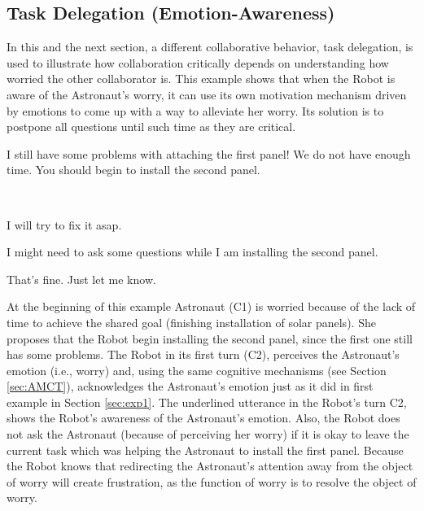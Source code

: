 \subsection{Task Delegation (Emotion-Awareness)}
\label{sec:exp3}

In this and the next section, a different collaborative behavior, task
delegation, is used to illustrate how collaboration critically depends on
understanding how worried the other collaborator is. This example shows that
when the Robot is aware of the Astronaut's worry, it can use its own motivation
mechanism driven by emotions to come up with a way to alleviate her worry. Its
solution is to postpone all questions until such time as they are
critical. 

\begin{description}
  \item \textit{\textbf{\fontsize{9pt}{12pt}\selectfont{C1. Astronaut:}}} I
  still have some problems with attaching the first panel! We do not have enough
  time. You should begin to install the second panel.\\

  \item {}\\

  \item \textit{\textbf{\fontsize{9pt}{12pt}\selectfont{C3. Astronaut:}}} I will
  try to fix it asap.\\

  \item \textit{\textbf{\fontsize{9pt}{12pt}\selectfont{C4. Robot:}}} I might
  need to ask some questions while I am installing the second panel.\\

  \item \textit{\textbf{\fontsize{9pt}{12pt}\selectfont{C5. Astronaut:}}} That's
  fine. Just let me know.
  
\end{description}

At the beginning of this example Astronaut (C1) is worried because of the lack
of time to achieve the shared goal (finishing installation of solar panels). She
proposes that the Robot begin installing the second panel, since the first one
still has some problems. The Robot in its first turn (C2), perceives the
Astronaut's emotion (i.e., worry) and, using the same cognitive mechanisms (see
Section \ref{sec:AMCT}), acknowledges the Astronaut's emotion just as it did in
first example in Section \ref{sec:exp1}. The underlined utterance in the Robot's
turn C2, shows the Robot's awareness of the Astronaut's emotion. Also, the Robot
does not ask the Astronaut (because of perceiving her worry) if it is okay to
leave the current task which was helping the Astronaut to install the first
panel. Because the Robot knows that redirecting the Astronaut's attention away
from the object of worry will create frustration, as the function of worry is to
resolve the object of worry.


